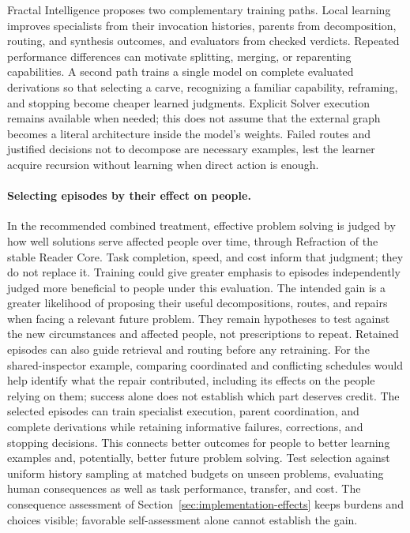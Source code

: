 \documentclass[10pt]{article}
\begin{document}
Fractal Intelligence proposes two complementary training paths. Local
learning improves specialists from their invocation histories, parents from
decomposition, routing, and synthesis outcomes, and evaluators from checked
verdicts. Repeated performance differences can motivate splitting, merging,
or reparenting capabilities. A second path trains a single model on complete
evaluated derivations so that selecting a carve, recognizing a familiar
capability, reframing, and stopping become cheaper learned judgments. Explicit
Solver execution remains available when needed; this does not assume that
the external graph becomes a literal architecture inside the model's weights.
Failed routes and justified decisions not to decompose are necessary examples,
lest the learner acquire recursion without learning when direct action is
enough.

\paragraph{Selecting episodes by their effect on people.}
In the recommended combined treatment, effective problem solving is judged by
how well solutions serve affected people over time, through Refraction of the
stable Reader Core. Task completion, speed, and cost inform that judgment;
they do not replace it. Training could give greater emphasis to episodes
independently judged more beneficial to people under this evaluation. The intended gain
is a greater likelihood of proposing their useful decompositions, routes, and
repairs when facing a relevant future problem. They remain hypotheses to test
against the new circumstances and affected people, not prescriptions to repeat.
Retained episodes can also guide retrieval and routing before any retraining.
For the shared-inspector example, comparing coordinated and conflicting
schedules would help identify what the repair contributed, including its
effects on the people relying on them; success alone does not establish which
part deserves credit. The selected episodes can train specialist execution,
parent coordination, and complete derivations while retaining informative
failures, corrections, and stopping decisions. This connects better outcomes
for people to better learning examples and, potentially, better future problem
solving. Test selection against uniform history sampling at matched budgets
on unseen problems, evaluating human consequences as well as task performance,
transfer, and cost. The consequence assessment of
Section~\ref{sec:implementation-effects} keeps burdens and choices visible; favorable self-assessment alone cannot establish the gain.
\end{document}
